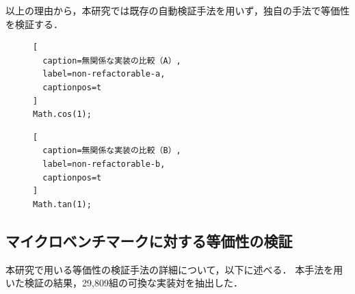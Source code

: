 \documentclass[11pt]{jreport}
\begin{document}
以上の理由から，本研究では既存の自動検証手法を用いず，独自の手法で等価性を検証する．


\begin{figure}[t]
\captionsetup{name=Listing}
\hspace{0.04\columnwidth}
\begin{minipage}[b]{0.445\linewidth}
\begin{lstlisting}[
  caption=無関係な実装の比較（A）,
  label=non-refactorable-a,
  captionpos=t
]
Math.cos(1);
\end{lstlisting}
\end{minipage}
\hspace{0.059\columnwidth}
\begin{minipage}[b]{0.445\linewidth}
\begin{lstlisting}[
  caption=無関係な実装の比較（B）,
  label=non-refactorable-b,
  captionpos=t
]
Math.tan(1);
\end{lstlisting}
\end{minipage}
\end{figure}




\subsection{マイクロベンチマークに対する等価性の検証}


本研究で用いる等価性の検証手法の詳細について，以下に述べる．
本手法を用いた検証の結果，29,809組の可換な実装対を抽出した．
\end{document}
